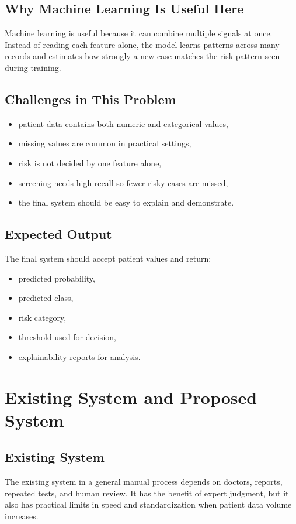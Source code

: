 \documentclass[12pt,a4paper,openany]{report}
\begin{document}
    \section{Why Machine Learning Is Useful Here}
    Machine learning is useful because it can combine multiple signals at once. Instead of reading each feature alone, the model learns patterns across many records and estimates how strongly a new case matches the risk pattern seen during training.

    \section{Challenges in This Problem}
    \begin{itemize}[leftmargin=1.4cm]
    \item patient data contains both numeric and categorical values,
    \item missing values are common in practical settings,
    \item risk is not decided by one feature alone,
    \item screening needs high recall so fewer risky cases are missed,
    \item the final system should be easy to explain and demonstrate.
    \end{itemize}

    \section{Expected Output}
    The final system should accept patient values and return:
    \begin{itemize}[leftmargin=1.4cm]
    \item predicted probability,
    \item predicted class,
    \item risk category,
    \item threshold used for decision,
    \item explainability reports for analysis.
    \end{itemize}

    \chapter{Existing System and Proposed System}
    \section{Existing System}
    The existing system in a general manual process depends on doctors, reports, repeated tests, and human review. It has the benefit of expert judgment, but it also has practical limits in speed and standardization when patient data volume increases.
\end{document}
